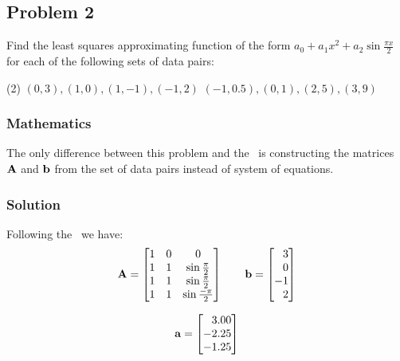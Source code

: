\subsection{Problem 2}%
\label{sec:problem_2}
Find the least squares approximating function of the form
$a_0+a_1x^2+a_2\sin{\frac{\pi{}x}{2}}$ for each of the following sets of data pairs:
\begin{tasks}(2)
  \task $(0,3),(1,0),(1,-1),(-1,2)$
  \task $(-1,0.5),(0,1),(2,5),(3,9)$
\end{tasks}
\subsubsection*{Mathematics}
The only difference between this problem and the~ is constructing
the matrices $\mathbf{A}$ and $\mathbf{b}$ from the set of data pairs instead of system of
equations.
\subsubsection*{Solution}
Following the~ we have:
\begin{equation*}
  \mathbf{A} = \begin{bmatrix}
    1 & 0 & 0 \\
    1 & 1 & \sin{\frac{\pi}{2}} \\
    1 & 1 & \sin{\frac{\pi}{2}} \\
    1 & 1 & \sin{\frac{-\pi}{2}}
  \end{bmatrix} \qquad
  \mathbf{b} = \begin{bmatrix}
    \phantom{-}3 \\
    \phantom{-}0 \\
    -1 \\
    \phantom{-}2
  \end{bmatrix}
\end{equation*}

\begin{equation*}
  \mathbf{a} = \begin{bmatrix}
    \phantom{-}3.00 \\
    -2.25 \\
    -1.25
  \end{bmatrix}
\end{equation*}

